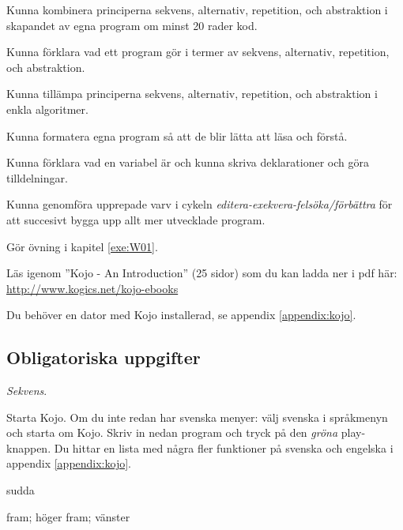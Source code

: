 
\Lab{\LabWeekONE}

\begin{Goals}
\item Kunna kombinera principerna sekvens, alternativ, repetition, och abstraktion i skapandet av egna program om minst 20 rader kod.
\item Kunna förklara vad ett program gör i termer av sekvens, alternativ, repetition, och abstraktion.
\item Kunna tillämpa principerna sekvens, alternativ, repetition, och abstraktion i enkla algoritmer.
\item Kunna formatera egna program så att de blir lätta att läsa och förstå.
\item Kunna förklara vad en variabel är och kunna skriva deklarationer och göra tilldelningar.
\item Kunna genomföra upprepade varv i cykeln \emph{editera-exekvera-felsöka/förbättra} för att succesivt bygga upp allt mer utvecklade program. 
\end{Goals}

\begin{Preparations}
\item Gör övning {\tt \ExeWeekONE} i kapitel \ref{exe:W01}.
\item Läs igenom ''Kojo - An Introduction'' (25 sidor) som du kan ladda ner i pdf  här: \href{http://www.kogics.net/kojo-ebooks}{http://www.kogics.net/kojo-ebooks}
\item Du behöver en dator med Kojo installerad, se appendix \ref{appendix:kojo}.
\end{Preparations}

\subsection{Obligatoriska uppgifter}


\Task \textit{Sekvens}. 

\Subtask Starta Kojo. Om du inte redan har svenska menyer: välj svenska i språkmenyn och starta om Kojo.  Skriv in nedan program och tryck på den \emph{gröna} play-knappen. Du hittar en lista med några fler funktioner på svenska och engelska i appendix \ref{appendix:kojo}.

\begin{Code}
sudda

fram; höger
fram; vänster
\end{Code}



